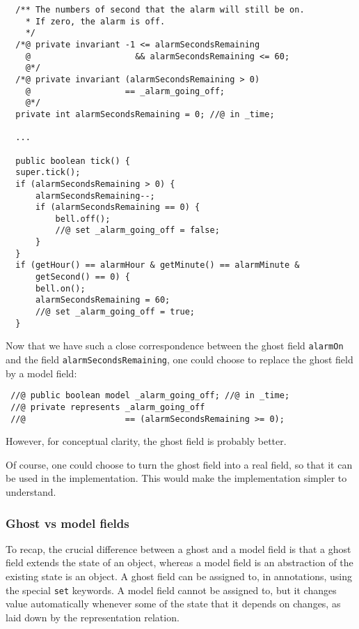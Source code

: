 \documentclass{llncs}
\begin{document}
\begin{verbatim}
  /** The numbers of second that the alarm will still be on.
    * If zero, the alarm is off.
    */
  /*@ private invariant -1 <= alarmSecondsRemaining 
    @                     && alarmSecondsRemaining <= 60;
    @*/
  /*@ private invariant (alarmSecondsRemaining > 0)
    @                   == _alarm_going_off;
    @*/
  private int alarmSecondsRemaining = 0; //@ in _time;

  ...

  public boolean tick() {
  super.tick();
  if (alarmSecondsRemaining > 0) {
      alarmSecondsRemaining--;
      if (alarmSecondsRemaining == 0) {
          bell.off();
          //@ set _alarm_going_off = false;
      }
  }
  if (getHour() == alarmHour & getMinute() == alarmMinute &
      getSecond() == 0) {
      bell.on();
      alarmSecondsRemaining = 60;
      //@ set _alarm_going_off = true;
  }
\end{verbatim}
Now that we have such a close correspondence between the
ghost field \texttt{alarmOn} and the field
\texttt{alarmSecondsRemaining}, one could choose to replace
the ghost field by a model field:
\begin{verbatim}
 //@ public boolean model _alarm_going_off; //@ in _time;
 //@ private represents _alarm_going_off 
 //@                    == (alarmSecondsRemaining >= 0);
\end{verbatim}
However, for conceptual clarity, the ghost field is probably better.

Of course, one could choose to turn the ghost field into a real field,
so that it can be used in the implementation.
This would make the implementation simpler to understand.

\subsubsection*{Ghost vs model fields}

To recap, the crucial difference between a ghost and a model field 
is that a ghost field extends the state of an object, whereas
a model field is an abstraction of the existing state is an object.
A ghost field can be assigned to, in annotations, using the
special \texttt{set} keywords.
A model field cannot be assigned to, but it changes value automatically
whenever some of the state that it depends on changes, as laid down
by the representation relation.

% 
% 
% 
\end{document}
